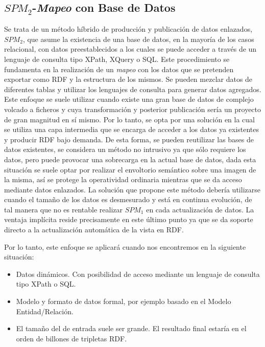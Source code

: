 \subsection{$SPM_2$-\textit{Mapeo} con Base de Datos}\label{mapeo-bbdd}
Se trata de un método híbrido de producción y publicación de datos enlazados, $SPM_2$, que asume la existencia de una base de datos, en la mayoría de los casos
relacional, con datos preestablecidos a los cuales se puede acceder a través de un lenguaje de consulta
tipo \gls{XPath}, \gls{XQuery} o \gls{SQL}. Este procedimiento se fundamenta en la realización de un \textit{mapeo} con los datos
que se pretenden exportar como \gls{RDF} y la estructura de los mismos. Se pueden mezclar datos de diferentes tablas
y utilizar los lenguajes de consulta para generar datos agregados. Este enfoque se suele utilizar cuando
existe una gran base de datos de complejo volcado a ficheros y cuya transformación y posterior publicación
sería un proyecto de gran magnitud en sí mismo. Por lo tanto, se opta por una solución en la cual se utiliza una capa
intermedia que se encarga de acceder a los datos ya existentes y producir RDF bajo demanda. De esta forma,
se pueden reutilizar las bases de datos existentes, se considera un método no intrusivo ya que sólo requiere los
datos, pero puede provocar una sobrecarga en la actual base de datos, dada esta situación se suele optar por realizar
el envoltorio semántico sobre una imagen de la misma, así se protege la operatividad ordinaria mientras que se
da acceso mediante datos enlazados. La solución que propone este método debería utilizarse cuando el tamaño
de los datos es desmesurado y está en continua evolución, de tal manera que no es rentable realizar $SPM_1$ en
cada actualización de datos. La ventaja implícita reside precisamente en este último punto ya que se da soporte
directo a la actualización automática de la vista en RDF. 


Por lo tanto, este enfoque se aplicará cuando nos encontremos en la siguiente situación:
\begin{itemize}
 \item Datos dinámicos. Con posibilidad de acceso mediante un lenguaje de consulta tipo XPath o SQL.
 \item Modelo y formato de datos formal, por ejemplo basado en el Modelo Entidad/Relación.
 \item El tamaño del \dataset de entrada suele ser grande. El resultado final
estaría en el orden de billones de tripletas RDF.
\end{itemize}


